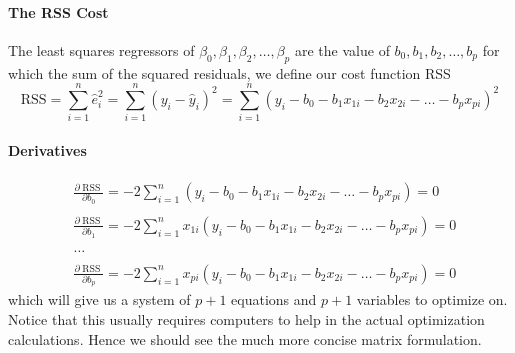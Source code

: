 \documentclass[11pt]{article}
\begin{document}
\paragraph{The RSS Cost}
The least squares regressors of $\beta_{0}, \beta_{1}, \beta_{2}, \ldots, \beta_{p}$ are the value of $b_{0}, b_{1}, b_{2}, \ldots, b_{p}$ for which the sum of the squared residuals, we define our cost function RSS
\begin{equation*}
    \mathrm{RSS}=\sum_{i=1}^{n} \hat{e}_{i}^{2}=\sum_{i=1}^{n}\left(y_{i}-\hat{y}_{i}\right)^{2}=\sum_{i=1}^{n}\left(y_{i}-b_{0}-b_{1} x_{1 i}-b_{2} x_{2 i}-\ldots-b_{p} x_{p i}\right)^{2}
\end{equation*}
\paragraph{Derivatives}
\begin{equation*}
    \begin{matrix}
        &\frac{\partial \operatorname{RSS}}{\partial b_{0}}=-2 \sum_{i=1}^{n}\left(y_{i}-b_{0}-b_{1} x_{1 i}-b_{2} x_{2 i}-\ldots-b_{p} x_{p i}\right)=0 \quad \,\,\\ \\
        &\frac{\partial \operatorname{RSS}}{\partial b_{1}}=-2 \sum_{i=1}^{n} x_{1 i}\left(y_{i}-b_{0}-b_{1} x_{1 i}-b_{2} x_{2 i}-\ldots-b_{p} x_{p i}\right)=0\\ \\
        & \dots \\ \\
        &\frac{\partial \operatorname{RSS}}{\partial b_{p}}=-2 \sum_{i=1}^{n} x_{p i}\left(y_{i}-b_{0}-b_{1} x_{1 i}-b_{2} x_{2 i}-\ldots-b_{p} x_{p i}\right)=0
    \end{matrix}
\end{equation*}
which will give us a system of $p+1$ equations and $p+1$ variables to optimize on. Notice that this usually requires computers to help in the actual optimization calculations. Hence we should see the much more concise matrix formulation.
\end{document}
